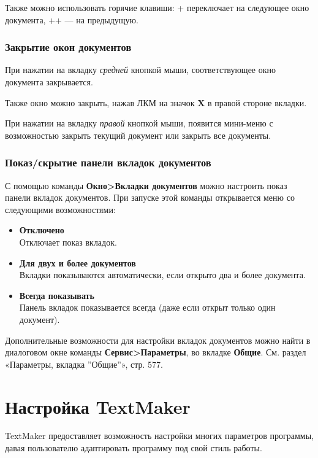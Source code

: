 ﻿\documentclass[a4paper,10pt]{article}
\begin{document}
Также можно использовать горячие клавиши: + переключает на следующее окно документа, ++ — на предыдущую.
 
 \subsubsection{Закрытие окон документов}
 При нажатии на вкладку \textit{средней} кнопкой мыши, соответствующее окно документа закрывается.
 
 Также окно можно закрыть, нажав ЛКМ на значок \textbf{X} в правой стороне вкладки.
 
 При нажатии на вкладку \textit{правой} кнопкой мыши, появится мини-меню с возможностью закрыть текущий документ или закрыть все документы.
 
 \subsubsection{Показ/скрытие панели вкладок документов}
 С помощью команды \textbf{Окно>Вкладки документов} можно настроить показ панели вкладок документов. При запуске этой команды открывается меню со следующими возможностями:
 
 \begin{itemize}
  \item \textbf{Отключено}\\
  Отключает показ вкладок.
  \item \textbf{Для двух и более документов}\\
  Вкладки показываются автоматически, если открыто два и более документа.
  \item \textbf{Всегда показывать}\\
  Панель вкладок показывается всегда (даже если открыт только один документ).
 \end{itemize}

 Дополнительные возможности для настройки вкладок документов можно найти в диалоговом окне команды \textbf{Сервис>Параметры}, во вкладке \textbf{Общие}. См. раздел «Параметры, вкладка ''Общие''», стр. 577.
 
 \section{Настройка TextMaker} \label{sec:настройкаtm}
 TextMaker предоставляет возможность настройки многих параметров программы, давая пользователю адаптировать программу под свой стиль работы.
 
\end{document}
